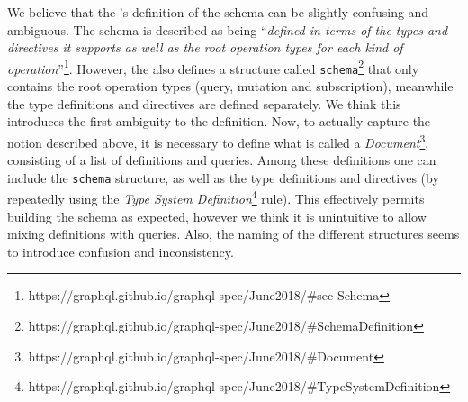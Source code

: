 We believe that the \spec's definition of the schema can be slightly confusing and ambiguous. The schema is described as being ``\textit{defined in terms of the types and directives it supports as well as the root operation types for each kind of operation}''\footnote{https://graphql.github.io/graphql-spec/June2018/\#sec-Schema}. However, the \spec also defines a structure called \texttt{schema}\footnote{https://graphql.github.io/graphql-spec/June2018/\#SchemaDefinition} that only contains the root operation types (query, mutation and subscription), meanwhile the type definitions and directives are defined separately. We think this introduces the first ambiguity to the definition. Now, to actually capture the notion described above, it is necessary to define what is called a \textit{Document}\footnote{https://graphql.github.io/graphql-spec/June2018/\#Document}, consisting of a list of definitions and queries. Among these definitions one can include the \texttt{schema} structure, as well as the type definitions and directives (by repeatedly using the \textit{Type System Definition}\footnote{https://graphql.github.io/graphql-spec/June2018/\#TypeSystemDefinition} rule). This effectively permits building the schema as expected, however we think it is unintuitive to allow mixing definitions with queries. Also, the naming of the different structures seems to introduce confusion and inconsistency.

 





